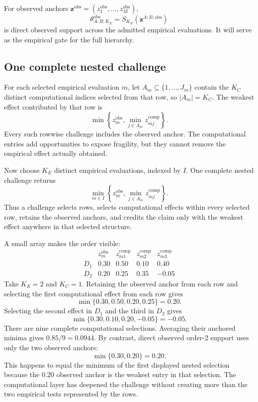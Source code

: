 \documentclass[11pt]{article}
\theoremstyle{remark}
\begin{document}
For observed anchors
$\mathbf z^{\mathrm{obs}}=(z_1^{\mathrm{obs}},\ldots,z_M^{\mathrm{obs}})$,
\begin{equation}
\theta^{\mathrm{obs}}_{A:B;K_E}
=
S_{K_E}(\mathbf z^{A:B,\mathrm{obs}})
\label{eq:observed-support}
\end{equation}
is direct observed support across the admitted empirical evaluations.
It will serve as the empirical gate for the full hierarchy.

\subsection{One complete nested challenge}

For each selected empirical evaluation $m$, let
$A_m\subseteq\{1,\ldots,J_m\}$ contain the $K_C$ distinct computational
indices selected from that row, so $|A_m|=K_C$. The weakest effect contributed
by that row is
\[
\min\left\{
z_m^{\mathrm{obs}},
\min_{j\in A_m}z_{mj}^{\mathrm{comp}}
\right\}.
\]
Every such rowwise challenge includes the observed anchor. The computational
entries add opportunities to expose fragility, but they cannot remove the
empirical effect actually obtained.

Now choose $K_E$ distinct empirical evaluations, indexed by $I$. One complete
nested challenge returns
\[
\min_{m\in I}
\left\{
z_m^{\mathrm{obs}},
\min_{j\in A_m}z_{mj}^{\mathrm{comp}}
\right\}.
\]
Thus a challenge selects rows, selects computational effects within every
selected row, retains the observed anchors, and credits the claim only with the
weakest effect anywhere in that selected structure.

A small array makes the order visible:
\[
\begin{array}{c|c|ccc}
&z_m^{\mathrm{obs}}&z_{m1}^{\mathrm{comp}}&z_{m2}^{\mathrm{comp}}&z_{m3}^{\mathrm{comp}}\\
\hline
D_1&0.30&0.50&0.10&0.40\\
D_2&0.20&0.25&0.35&-0.05
\end{array}
\]
Take $K_E=2$ and $K_C=1$. Retaining the observed anchor from each row and
selecting the first computational effect from each row gives
\[
\min\{0.30,0.50,0.20,0.25\}=0.20.
\]
Selecting the second effect in $D_1$ and the third in $D_2$ gives
\[
\min\{0.30,0.10,0.20,-0.05\}=-0.05.
\]
There are nine complete computational selections. Averaging their anchored
minima gives $0.85/9=0.094\overline4$. By contrast, direct observed order-2
support uses only the two observed anchors:
\[
\min\{0.30,0.20\}=0.20.
\]
This happens to equal the minimum of the first displayed nested selection
because the $0.20$ observed anchor is the weakest entry in that selection. The
computational layer has deepened the challenge without creating more than the
two empirical tests represented by the rows.
\end{document}
